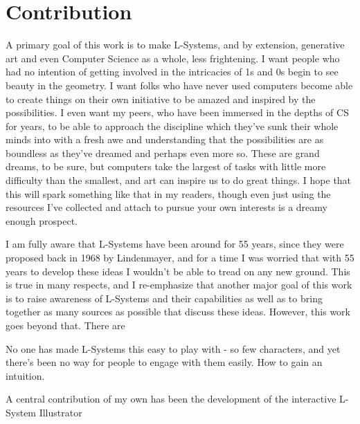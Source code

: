 \documentclass[12pt,twoside]{reedthesis}
\begin{document}
\chapter{Contribution}
	A primary goal of this work is to make L-Systems, and by extension, generative art and even Computer Science as a whole, less frightening. I want people who had no intention of getting involved in the intricacies of 1s and 0s begin to see beauty in the geometry. I want folks who have never used computers become able to create things on their own initiative to be amazed and inspired by the possibilities. I even want my peers, who have been immersed in the depths of CS for years, to be able to approach the discipline which they’ve sunk their whole minds into with a fresh awe and understanding that the possibilities are as boundless as they’ve dreamed and perhaps even more so. These are grand dreams, to be sure, but computers take the largest of tasks with little more difficulty than the smallest, and art can inspire us to do great things. I hope that this will spark something like that in my readers, though even just using the resources I’ve collected and attach to pursue your own interests is a dreamy enough prospect.
	
	I am fully aware that L-Systems have been around for 55 years, since they were proposed back in 1968 by Lindenmayer, and for a time I was worried that with 55 years to develop these ideas I wouldn't be able to tread on any new ground. This is true in many respects, and I re-emphasize that another major goal of this work is to raise awareness of L-Systems and their capabilities as well as to bring together as many sources as possible that discuss these ideas. However, this work goes beyond that. There are 
	
	No one has made L-Systems this easy to play with - so few characters, and yet there's been no way for people to engage with them easily. How to gain an intuition.
	
	A central contribution of my own has been the development of the interactive L-System Illustrator
	
	
\end{document}
